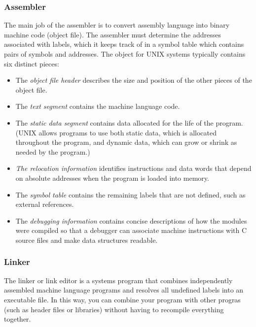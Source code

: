 \documentclass[10pt]{article}
\begin{document}
\subsubsection{Assembler}
The main job of the assembler is to convert assembly language into binary machine code (object file). The assembler must determine the addresses associated with labels, which it keeps track of in a symbol table which contains pairs of symbols and addresses.  The object for UNIX systems typically contains six distinct pieces:
\begin{itemize}
\item The \textit{object file header} describes the size and position of the other pieces of the object file.
\item The \textit{text segment} contains the machine language code.
\item The \textit{static data segment} contains data allocated for the life of the program. (UNIX allows programs to use both static data, which is allocated throughout the program, and dynamic data, which can grow or shrink as needed by the program.)
\item \textit{The relocation information} identifies instructions and data words that depend on absolute addresses when the program is loaded into memory.
\item The \textit{symbol table} contains the remaining labels that are not defined, such as external references.
\item The \textit{debugging information} contains concise descriptions of how the modules were compiled so that a debugger can associate machine instructions with C source files and make data structures readable.
\end{itemize}
\subsubsection{Linker}
The linker or link editor is a systems program that combines independently assembled machine language programs and resolves all undefined labels into an executable file.  In this way, you can combine your program with other progras (such as header files or libraries) without having to recompile everything together.
\end{document}
